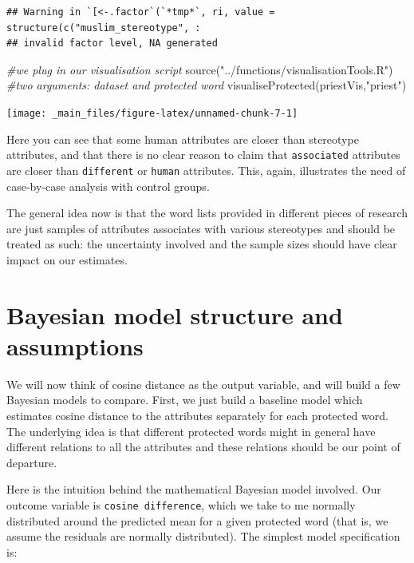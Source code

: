 \documentclass[
  12pt,
]{book}
\newenvironment{Shaded}{\begin{snugshade}}{\end{snugshade}}
\newcommand{\CommentTok}[1]{\textcolor[rgb]{0.56,0.35,0.01}{\textit{#1}}}
\newcommand{\FunctionTok}[1]{\textcolor[rgb]{0.00,0.00,0.00}{#1}}
\newcommand{\NormalTok}[1]{#1}
\newcommand{\StringTok}[1]{\textcolor[rgb]{0.31,0.60,0.02}{#1}}
\begin{document}
\begin{verbatim}
## Warning in `[<-.factor`(`*tmp*`, ri, value = structure(c("muslim_stereotype", :
## invalid factor level, NA generated
\end{verbatim}

\begin{Shaded}
\begin{Highlighting}[]
\CommentTok{\#we plug in our visualisation script}
\FunctionTok{source}\NormalTok{(}\StringTok{"../functions/visualisationTools.R"}\NormalTok{)}
\CommentTok{\#two arguments: dataset and protected word}
\FunctionTok{visualiseProtected}\NormalTok{(priestVis,}\StringTok{"priest"}\NormalTok{)}
\end{Highlighting}
\end{Shaded}

\begin{center}\texttt{[image: \_main\_files/figure-latex/unnamed-chunk-7-1]} \end{center}
\normalsize

\noindent Here you can see that some human attributes are closer than stereotype attributes, and that there is no clear reason to claim that \texttt{associated} attributes are closer than \texttt{different} or \texttt{human} attributes. This, again, illustrates the need of case-by-case analysis with control groups.

The general idea now is that the word lists provided in different pieces of research are just samples of attributes associates with various stereotypes and should be treated as such: the uncertainty involved and the sample sizes should have clear impact on our estimates.

\hypertarget{bayesian-model-structure-and-assumptions}{%
\section{Bayesian model structure and assumptions}\label{bayesian-model-structure-and-assumptions}}

We will now think of cosine distance as the output variable, and
will build a few Bayesian models to compare. First, we just build a baseline model which estimates cosine distance to the attributes separately for each protected word. The underlying idea is that different protected words might in general have different relations to all the attributes and these relations should be our point of departure.

Here is the intuition behind the mathematical Bayesian model involved. Our outcome variable is \texttt{cosine\ difference}, which we take to me normally distributed around the predicted mean for a given protected word (that is, we assume the residuals are normally distributed). The simplest model specification is:
\end{document}
